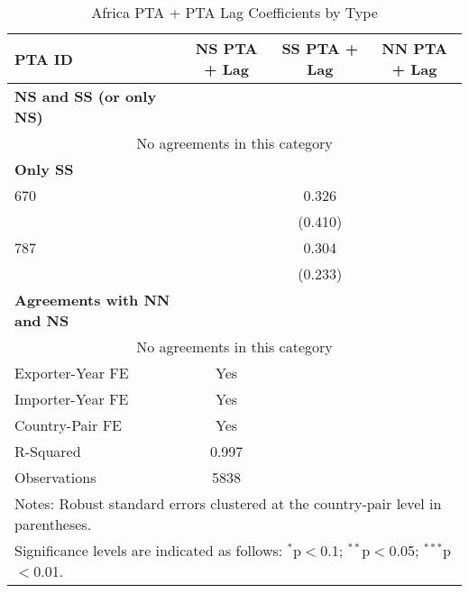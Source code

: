 \begin{table}[htbp]
    \centering
    \caption{Africa PTA + PTA Lag Coefficients by Type}
    \label{tab:africa_pta}
    \begin{adjustbox}{max width=\textwidth}
    \begin{tabular}{lccc}
    \hline
    \textbf{PTA ID} & \textbf{NS PTA + Lag} & \textbf{SS PTA + Lag} & \textbf{NN PTA + Lag} \\
    \hline
    \textbf{NS and SS (or only NS)} &  &  &  \\
    \hline
    \multicolumn{4}{c}{No agreements in this category} \\
    \hline
    \textbf{Only SS} &  &  &  \\
    \hline
    670 &  & 0.326 &  \\
     &  & (0.410) &  \\
    787 &  & 0.304 &  \\
     &  & (0.233) &  \\
    \hline
    \textbf{Agreements with NN and NS} &  &  &  \\
    \hline
    \multicolumn{4}{c}{No agreements in this category} \\
    \hline
    Exporter-Year FE & Yes \\
    Importer-Year FE & Yes \\
    Country-Pair FE & Yes \\
    R-Squared & 0.997 \\
    Observations & 5838 \\
    \hline
    \multicolumn{4}{l}{\footnotesize{Notes: Robust standard errors clustered at the country-pair level in parentheses.}} \\
    \multicolumn{4}{l}{\footnotesize{Significance levels are indicated as follows: $^{\ast}$p$<$0.1; $^{\ast\ast}$p$<$0.05; $^{\ast\ast\ast}$p$<$0.01.}} \\
    \end{tabular}
    \end{adjustbox}
\end{table}

